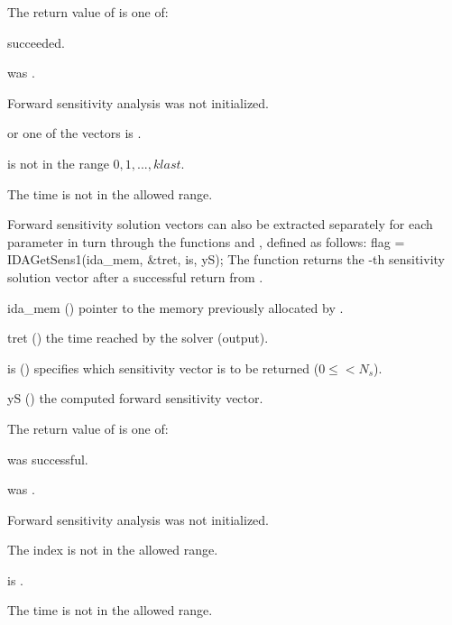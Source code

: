 {
  The return value  of  is one of:
  \begin{args}
  \item[\Id{IDA\_SUCCESS}] 
     succeeded.
  \item[\Id{IDA\_MEM\_NULL}] 
     was .
  \item[\Id{IDA\_NO\_SENS}] 
    Forward sensitivity analysis was not initialized.
  \item[\Id{IDA\_BAD\_DKY}]
     or one of the vectors  is .
  \item[\Id{IDA\_BAD\_K}]
     is not in the range $0, 1, ..., klast$.
  \item[\Id{IDA\_BAD\_T}] 
    The time  is not in the allowed range.
  \end{args}
}
{}
Forward sensitivity solution vectors can also be extracted separately for 
each parameter in turn through the functions  and
, defined as follows:
{
  flag = IDAGetSens1(ida\_mem, \&tret, is, yS);
}
{
  The function  returns the -th sensitivity solution vector
  after a successful return from .
}
{
  \begin{args}
  \item[ida\_mem] ()
    pointer to the memory previously allocated by .
  \item[tret] ()
    the time reached by the solver (output).
  \item[is] () specifies which sensitivity vector is to be returned
    ($0\le$$< N_s$).
  \item[yS] ()
    the computed forward sensitivity vector.
  \end{args}
}
{
  The return value  of  is one of:
  \begin{args}
  \item[\Id{IDA\_SUCCESS}]
     was successful.
  \item[\Id{IDA\_MEM\_NULL}] 
     was .
  \item[\Id{IDA\_NO\_SENS}] 
    Forward sensitivity analysis was not initialized.
  \item[\Id{IDA\_BAD\_IS}]
    The index  is not in the allowed range.
  \item[\Id{IDA\_BAD\_DKY}] 
     is .
  \item[\Id{IDA\_BAD\_T}] 
    The time  is not in the allowed range.
  \end{args}
}
